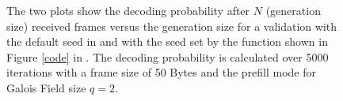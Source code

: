 \documentclass[a4paper,english,10pt]{tumarticle}
\begin{document}
\begin{figure}[htb]
  \centering
  \hfill
   \caption{The two
  plots show the decoding probability after $N$ (generation size) received frames versus the
  generation size for a validation with the default seed in \protect{} and with
  the seed set by the function shown in Figure \ref{code} in \protect{}. The
  decoding probability is calculated over 5000 iterations with a frame size of 50 Bytes and the
  prefill mode for Galois Field size $q=2$.}
  \label{fig:noseed}
\end{figure}
\end{document}
